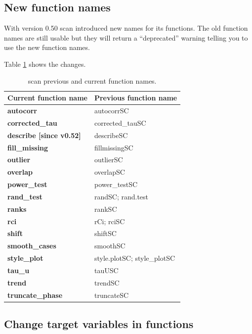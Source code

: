 \documentclass[
]{book}
\begin{document}
\hypertarget{new-function-names}{%
\subsection{New function names}\label{new-function-names}}

With version 0.50 scan introduced new names for its functions. The old function names are still usable but they will return a ``deprecated'' warning telling you to use the new function names.

Table \ref{tab:table-aliases} shows the changes.

\begin{table}

\caption{\label{tab:table-aliases}scan previous and current function names.}
\begin{tabular}[t]{>{\raggedright\arraybackslash}p{15em}>{\raggedright\arraybackslash}p{30em}}
\toprule
Current function name & Previous function name\\
\midrule
\textbf{autocorr} & autocorrSC\\
\textbf{corrected\_tau} & corrected\_tauSC\\
\textbf{describe [since v0.52]} & describeSC\\
\textbf{fill\_missing} & fillmissingSC\\
\textbf{outlier} & outlierSC\\
\textbf{overlap} & overlapSC\\
\textbf{power\_test} & power\_testSC\\
\textbf{rand\_test} & randSC; rand.test\\
\textbf{ranks} & rankSC\\
\textbf{rci} & rCi; rciSC\\
\textbf{shift} & shiftSC\\
\textbf{smooth\_cases} & smoothSC\\
\textbf{style\_plot} & style.plotSC; style\_plotSC\\
\textbf{tau\_u} & tauUSC\\
\textbf{trend} & trendSC\\
\textbf{truncate\_phase} & truncateSC\\
\bottomrule
\end{tabular}
\end{table}

\hypertarget{change-target-variables-in-functions}{%
\subsection{Change target variables in functions}\label{change-target-variables-in-functions}}
\end{document}
